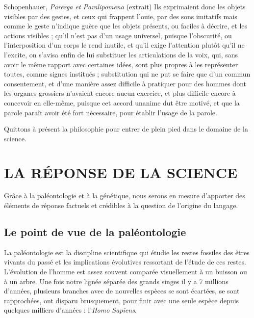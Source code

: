 \begin{bbcomplement}{Schopenhauer, \textit{Parerga et Paralipomena} (extrait)}
Ils exprimaient donc les objets visibles par des gestes, et ceux qui frappent l’ouïe, par des sons imitatifs mais comme le geste n’indique guère que les objets présents, ou faciles à décrire, et les actions visibles ; qu’il n’est pas d’un usage universel, puisque l’obscurité, ou l’interposition d’un corps le rend inutile, et qu’il exige l’attention plutôt qu’il ne l’excite, on s’avisa enfin de lui substituer les articulations de la voix, qui, sans avoir le même rapport avec certaines idées, sont plus propres à les représenter toutes, comme
signes institués ; substitution qui ne put se faire que d’un commun consentement, et d’une manière assez difficile à pratiquer pour des hommes dont les organes grossiers n’avaient encore aucun exercice, et plus difficile encore à concevoir en elle-même, puisque cet accord unanime dut être motivé, et que la parole paraît avoir été fort nécessaire, pour établir l’usage de la parole.
\end{bbcomplement}
Quittons à présent la philosophie pour entrer de plein pied dans le domaine de la science.
\section{LA RÉPONSE DE LA SCIENCE}
Grâce à la paléontologie et à la génétique, nous serons en mesure d’apporter des éléments de réponse factuels et crédibles à la question de l’origine du langage.
\subsection{Le point de vue de la paléontologie}
La paléontologie est la discipline scientifique qui étudie les restes fossiles des êtres vivants du passé et les implications évolutives ressortant de l’étude de ces restes. L’évolution de l’homme est assez souvent comparée visuellement à un buisson ou à un arbre. Une fois notre lignée séparée des grands singes il y a 7 millions d’années, plusieurs branches avec de nouvelles espèces se sont écartées, se sont rapprochées, ont disparu brusquement, pour finir avec une seule espèce depuis quelques milliers d’années : l’\textit{Homo Sapiens}.
